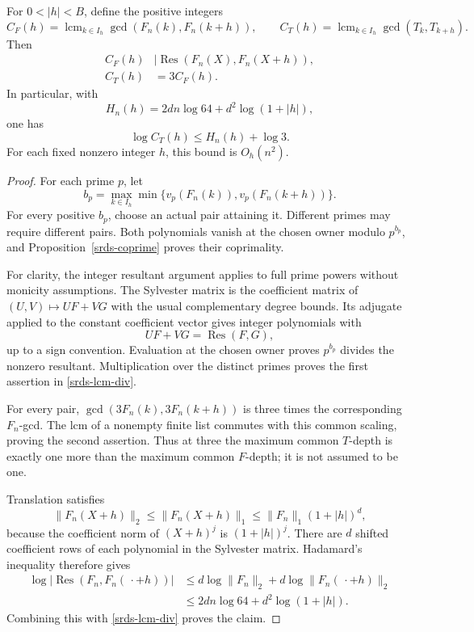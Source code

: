 \begin{proposition}
\label{srds-lcm}
For \(0<|h|<B\), define the positive integers
\[
 C_F(h)=\mathop{\operatorname{lcm}}_{k\in I_h}
       \gcd(F_n(k),F_n(k+h)),\qquad
 C_T(h)=\mathop{\operatorname{lcm}}_{k\in I_h}
       \gcd(T_k,T_{k+h}).
\]
Then
\begin{equation}
 \begin{split}
 C_F(h)&\mid\operatorname{Res}(F_n(X),F_n(X+h)),\\
 C_T(h)&=3C_F(h).
 \end{split}
 \label{srds-lcm-div}
\end{equation}
In particular, with
\begin{equation}
 H_n(h)=2dn\log64+d^2\log(1+|h|),
 \label{srds-height-cost}
\end{equation}
one has
\begin{equation}
 \log C_T(h)\le H_n(h)+\log3.
 \label{srds-lcm-height}
\end{equation}
For each fixed nonzero integer \(h\), this bound is \(O_h(n^2)\).
\end{proposition}
\begin{proof}
For each prime \(p\), let
\[
 b_p=\max_{k\in I_h}
       \min\{v_p(F_n(k)),v_p(F_n(k+h))\}.
\]
For every positive \(b_p\), choose an actual pair attaining it.
Different primes may require different pairs. Both polynomials
vanish at the chosen owner modulo \(p^{b_p}\), and
Proposition~\ref{srds-coprime} proves their coprimality.

For clarity, the integer resultant argument applies to full prime
powers without monicity assumptions. The Sylvester matrix is the
coefficient matrix of
\((U,V)\mapsto UF+VG\) with the usual complementary degree
bounds. Its adjugate applied to the constant coefficient vector
gives integer polynomials with
\[
 UF+VG=\operatorname{Res}(F,G),
\]
up to a sign convention. Evaluation at the chosen owner proves
\(p^{b_p}\) divides the nonzero resultant. Multiplication over
the distinct primes proves the first assertion in
\eqref{srds-lcm-div}.

For every pair, \(\gcd(3F_n(k),3F_n(k+h))\) is three times the
corresponding \(F_n\)-gcd. The lcm of a nonempty finite list
commutes with this common scaling, proving the second assertion.
Thus at three the maximum common \(T\)-depth is exactly one more
than the maximum common \(F\)-depth; it is not assumed to be one.

Translation satisfies
\[
 \|F_n(X+h)\|_2\le\|F_n(X+h)\|_1
       \le\|F_n\|_1(1+|h|)^d,
\]
because the coefficient norm of \((X+h)^j\) is
\((1+|h|)^j\). There are \(d\) shifted coefficient rows of each
polynomial in the Sylvester matrix. Hadamard's inequality therefore
gives
\[
 \begin{split}
 \log|\operatorname{Res}(F_n,F_n(\,\cdot+h))|
 &\le d\log\|F_n\|_2+d\log\|F_n(\,\cdot+h)\|_2\\
 &\le2dn\log64+d^2\log(1+|h|).
 \end{split}
\]
Combining this with \eqref{srds-lcm-div} proves the claim.
\end{proof}

